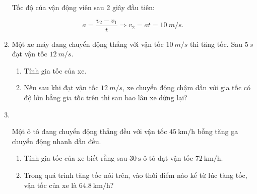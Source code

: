 \begin{enumerate}[label=\bfseries Bài \arabic*:,leftmargin=1.5cm]
{		Tốc độ của vận động viên sau 2 giây đầu tiên:
		
		$$a = \dfrac{v_2 - v_1}{t} \Rightarrow v_2 = at = \SI{10}{m/s}.$$
	}
	
	\item {}
	
	{
		Một xe máy đang chuyển động thẳng với vận tốc $\SI{10}{m/s}$ thì tăng tốc. Sau $\SI{5}{s}$ đạt vận tốc $\SI{12}{m/s}.$
		
		\begin{enumerate}[label=\alph*)]
			\item Tính gia tốc của xe.
			\item Nếu sau khi đạt vận tốc $\SI{12}{m/s}$, xe chuyển động chậm dần với gia tốc có độ lớn bằng gia tốc trên thì sau bao lâu xe dừng lại?
		\end{enumerate}
	}

	
	
	
	\item {}\\
{Một ô tô đang chuyển động thẳng đều với vận tốc $\SI{45}{\kilo\meter/\hour}$ bỗng tăng ga chuyển động nhanh dần đều.
	\begin{enumerate}[label=\alph*.]
		\item Tính gia tốc của xe biết rằng sau $\SI{30}{\second}$ ô tô đạt vận tốc $\SI{72}{\kilo\meter/\hour}$.
		\item Trong quá trình tăng tốc nói trên, vào thời điểm nào kể từ lúc tăng tốc, vận tốc của xe là $\SI{64.8}{\kilo\meter/\hour}$?
	\end{enumerate}
}
\end{enumerate}
